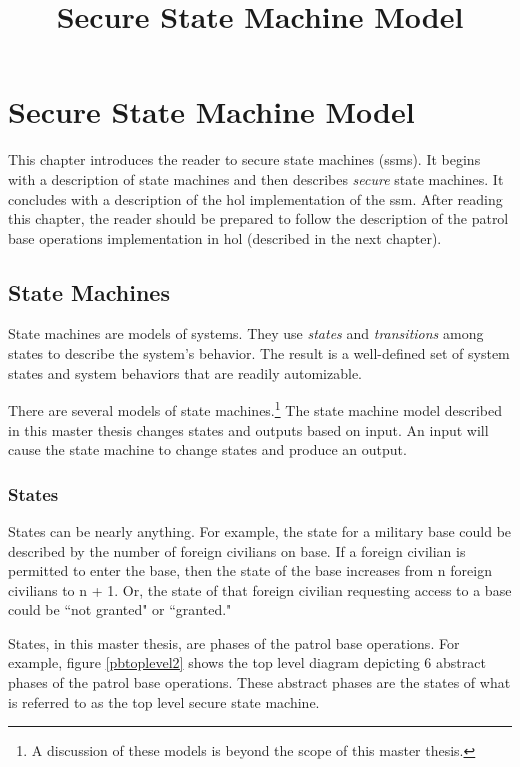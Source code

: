\documentclass[../../main/main.tex]{subfiles}
\begin{document}
\title{Secure State Machine Model}

\chapter{Secure State Machine Model}\label{chp:ssmmodel}
This chapter introduces the reader to secure state machines (\gls{ssm}s).  It begins with a description of state machines and then describes \textit{secure} state machines.  It concludes with a description of the \gls{hol} implementation of the \gls{ssm}.  After reading this chapter, the reader should be prepared to follow the description of the patrol base operations implementation in \gls{hol} (described in the next chapter).

\section{State Machines}\label{sec:sm}
State machines are models of systems.  They use \textit{states} and \textit{transitions} among states to describe the system's behavior.  The result is a well-defined set of system states and system behaviors that are readily automizable.  


There are several models of state machines.\footnote{A discussion of these models is beyond the scope of this master thesis.}  The state machine model described in this master thesis changes states and outputs based on input.  An input will cause the state machine to change states and produce an output.

\subsection{States}
States can be nearly anything.  For example, the state for a military base could be described by the number of foreign civilians on base.  If a foreign civilian is permitted to enter the base, then the state of the base increases from n foreign civilians to n + 1. Or, the state of that foreign civilian requesting access to a base could be ``not granted" or ``granted."

States, in this master thesis, are phases of the patrol base operations.  For example, figure \ref{pbtoplevel2} shows the top level diagram depicting 6 abstract phases of the patrol base operations.  These abstract phases are the states of what is referred to as the top level secure state machine.
\end{document}
